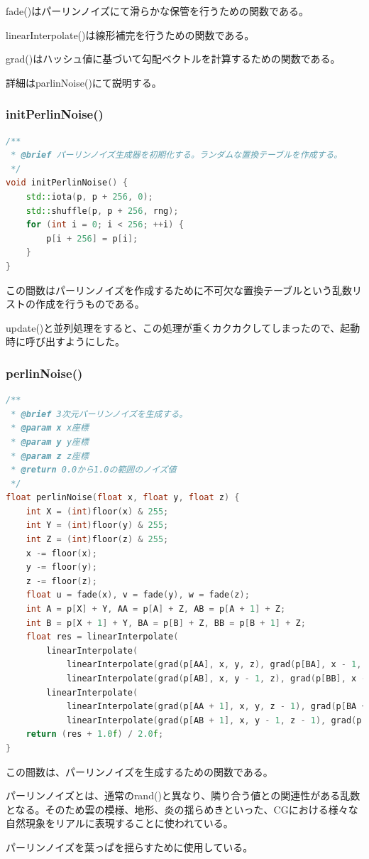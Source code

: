 \documentclass[upIatex,dvipdfmx,a4paper]{jsarticle}
\begin{document}
fade()はパーリンノイズにて滑らかな保管を行うための関数である。

linearInterpolate()は線形補完を行うための関数である。

grad()はハッシュ値に基づいて勾配ベクトルを計算するための関数である。

詳細はparlinNoise()にて説明する。

\subsubsection{initPerlinNoise()}
\begin{lstlisting}[language=C++, caption={initPerlinNoise() 関数}, label={lst:initPerlinNoise}]
/**
 * @brief パーリンノイズ生成器を初期化する。ランダムな置換テーブルを作成する。
 */
void initPerlinNoise() {
    std::iota(p, p + 256, 0);
    std::shuffle(p, p + 256, rng);
    for (int i = 0; i < 256; ++i) {
        p[i + 256] = p[i];
    }
}
\end{lstlisting}

この間数はパーリンノイズを作成するために不可欠な置換テーブルという乱数リストの作成を行うものである。

update()と並列処理をすると、この処理が重くカクカクしてしまったので、起動時に呼び出すようにした。

\subsubsection{perlinNoise()}
\begin{lstlisting}[language=C++, caption={perlinNoise() 関数}, label={lst:perlinNoise}]
/**
 * @brief 3次元パーリンノイズを生成する。
 * @param x x座標
 * @param y y座標
 * @param z z座標
 * @return 0.0から1.0の範囲のノイズ値
 */
float perlinNoise(float x, float y, float z) {
    int X = (int)floor(x) & 255;
    int Y = (int)floor(y) & 255;
    int Z = (int)floor(z) & 255;
    x -= floor(x);
    y -= floor(y);
    z -= floor(z);
    float u = fade(x), v = fade(y), w = fade(z);
    int A = p[X] + Y, AA = p[A] + Z, AB = p[A + 1] + Z;
    int B = p[X + 1] + Y, BA = p[B] + Z, BB = p[B + 1] + Z;
    float res = linearInterpolate(
        linearInterpolate(
            linearInterpolate(grad(p[AA], x, y, z), grad(p[BA], x - 1, y, z), u),
            linearInterpolate(grad(p[AB], x, y - 1, z), grad(p[BB], x - 1, y - 1, z), u), v),
        linearInterpolate(
            linearInterpolate(grad(p[AA + 1], x, y, z - 1), grad(p[BA + 1], x - 1, y, z - 1), u),
            linearInterpolate(grad(p[AB + 1], x, y - 1, z - 1), grad(p[BB + 1], x - 1, y - 1, z - 1), u), v), w);
    return (res + 1.0f) / 2.0f;
}
\end{lstlisting}

この間数は、パーリンノイズを生成するための関数である。

パーリンノイズとは、通常のrand()と異なり、隣り合う値との関連性がある乱数となる。そのため雲の模様、地形、炎の揺らめきといった、CGにおける様々な自然現象をリアルに表現することに使われている。

パーリンノイズを葉っぱを揺らすために使用している。
\end{document}
